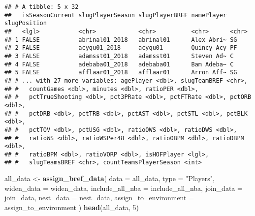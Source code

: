 \documentclass[]{article}
\newenvironment{Shaded}{\begin{snugshade}}{\end{snugshade}}
\newcommand{\KeywordTok}[1]{\textcolor[rgb]{0.13,0.29,0.53}{\textbf{#1}}}
\newcommand{\DataTypeTok}[1]{\textcolor[rgb]{0.13,0.29,0.53}{#1}}
\newcommand{\DecValTok}[1]{\textcolor[rgb]{0.00,0.00,0.81}{#1}}
\newcommand{\StringTok}[1]{\textcolor[rgb]{0.31,0.60,0.02}{#1}}
\newcommand{\CommentTok}[1]{\textcolor[rgb]{0.56,0.35,0.01}{\textit{#1}}}
\newcommand{\OperatorTok}[1]{\textcolor[rgb]{0.81,0.36,0.00}{\textbf{#1}}}
\newcommand{\NormalTok}[1]{#1}
\begin{document}
\begin{Shaded}
\end{Shaded}

\begin{verbatim}
## # A tibble: 5 x 32
##   isSeasonCurrent slugPlayerSeason slugPlayerBREF namePlayer slugPosition
##   <lgl>           <chr>            <chr>          <chr>      <chr>       
## 1 FALSE           abrinal01_2018   abrinal01      Alex Abri~ SG          
## 2 FALSE           acyqu01_2018     acyqu01        Quincy Acy PF          
## 3 FALSE           adamsst01_2018   adamsst01      Steven Ad~ C           
## 4 FALSE           adebaba01_2018   adebaba01      Bam Adeba~ C           
## 5 FALSE           afflaar01_2018   afflaar01      Arron Aff~ SG          
## # ... with 27 more variables: agePlayer <dbl>, slugTeamBREF <chr>,
## #   countGames <dbl>, minutes <dbl>, ratioPER <dbl>,
## #   pctTrueShooting <dbl>, pct3PRate <dbl>, pctFTRate <dbl>, pctORB <dbl>,
## #   pctDRB <dbl>, pctTRB <dbl>, pctAST <dbl>, pctSTL <dbl>, pctBLK <dbl>,
## #   pctTOV <dbl>, pctUSG <dbl>, ratioOWS <dbl>, ratioDWS <dbl>,
## #   ratioWS <dbl>, ratioWSPer48 <dbl>, ratioOBPM <dbl>, ratioDBPM <dbl>,
## #   ratioBPM <dbl>, ratioVORP <dbl>, isHOFPlayer <lgl>,
## #   slugTeamsBREF <chr>, countTeamsPlayerSeason <int>
\end{verbatim}

\begin{Shaded}
\begin{Highlighting}[]
\NormalTok{all_data <-}
\StringTok{  }\KeywordTok{assign_bref_data}\NormalTok{(}
    \DataTypeTok{data =}\NormalTok{ all_data,}
    \DataTypeTok{type =} \StringTok{"Players"}\NormalTok{,}
    \DataTypeTok{widen_data =}\NormalTok{ widen_data,}
    \DataTypeTok{include_all_nba =}\NormalTok{ include_all_nba,}
    \DataTypeTok{join_data =}\NormalTok{ join_data,}
    \DataTypeTok{nest_data =}\NormalTok{ nest_data,}
    \DataTypeTok{assign_to_environment =}\NormalTok{ assign_to_environment}
\NormalTok{  )}
\KeywordTok{head}\NormalTok{(all_data, }\DecValTok{5}\NormalTok{)}
\end{Highlighting}
\end{Shaded}
\end{document}
